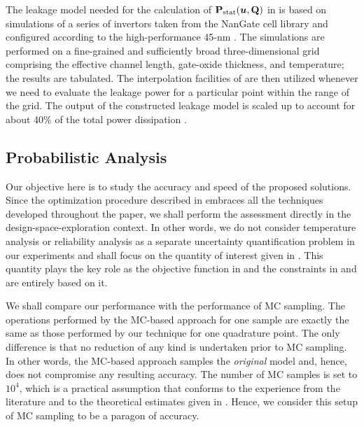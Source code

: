 The leakage model needed for the calculation of $\mathbf{P}_{\mathrm{stat}}(\boldsymbol{u}, \mathbf{Q})$ in
 is based on  simulations of a series of
 invertors taken from the NanGate cell library and configured according
to the high-performance 45-nm  \cite{ptm}. The simulations are performed
on a fine-grained and sufficiently broad three-dimensional grid comprising the
effective channel length, gate-oxide thickness, and temperature; the results are
tabulated. The interpolation facilities of  \cite{matlab} are then
utilized whenever we need to evaluate the leakage power for a particular point
within the range of the grid. The output of the constructed leakage model is
scaled up to account for about 40\% of the total power dissipation
\cite{liu2007}.

\subsection{Probabilistic Analysis}

Our objective here is to study the accuracy and speed of the proposed solutions.
Since the optimization procedure described in 
embraces all the techniques developed throughout the paper, we shall perform the
assessment directly in the design-space-exploration context. In other words, we
do not consider temperature analysis or reliability analysis as a separate
uncertainty quantification problem in our experiments and shall focus on the
quantity of interest given in . This quantity plays
the key role as the objective function in  and the constraints
in  and  are entirely
based on it.

We shall compare our performance with the performance of \ac{MC} sampling. The
operations performed by the \ac{MC}-based approach for one sample are exactly
the same as those performed by our technique for one quadrature point. The only
difference is that no reduction of any kind is undertaken prior to \ac{MC}
sampling. In other words, the \ac{MC}-based approach samples the \emph{original}
model and, hence, does not compromise any resulting accuracy. The number of
\ac{MC} samples is set to $10^4$, which is a practical assumption that conforms
to the experience from the literature \cite{ukhov2014, lee2013, juan2012,
xiang2010} and to the theoretical estimates given in \cite{diaz-emparanza2002}.
Hence, we consider this setup of \ac{MC} sampling to be a paragon of accuracy.

